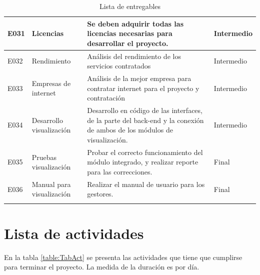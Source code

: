 \documentclass[12pt,twoside]{article}
\begin{document}
\begin{longtable}{|l|m{3cm}|m{6cm}|m{2cm}|}
    E031 & Licencias & Se deben adquirir todas las licencias necesarias para desarrollar el proyecto. & Intermedio \\ \hline
    E032 & Rendimiento & Análisis del rendimiento de los servicios contratados & Intermedio \\ \hline
    E033 & Empresas de internet & Análisis de la mejor empresa para contratar internet para el proyecto y contratación & Intermedio \\ \hline
    E034 & Desarrollo visualización & Desarrollo en código de las interfaces, de la parte del back-end y la conexión de ambos de los módulos de visualización. & Intermedio \\ \hline
    E035 & Pruebas visualización & Probar el correcto funcionamiento del módulo integrado, y realizar reporte para las correcciones. & Final \\ \hline
    E036 & Manual para visualización & Realizar el manual de usuario para los gestores. & Final \\ \hline
    \caption{Lista de entregables}
    \label{table:TabNec}    
\end{longtable}
    
\section{Lista de actividades}

En la tabla \ref{table:TabAct} se presenta las actividades que tiene que cumplirse para terminar el proyecto.
La medida de la duración es por día.
\end{document}
